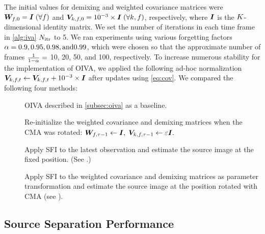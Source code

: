 \documentclass[sip,biber]{now-journal}
\begin{document}
The initial values for demixing and weighted covariance matrices were
$\bm{W} _{f,0} = \bm{I}\; (\forall f)$ and $\bm{V} _{k,f,0} = 10^{-3} \times \bm{I}\; (\forall k, f)$, respectively, where $\bm{I}$ is the $K$-dimensional identity matrix.
We set the number of iterations in each time frame in \cref{alg:iva} $N _{\mathrm{itr}}$ to 5.
We ran experiments using various forgetting factors $\alpha = 0.9, 0.95, 0.98, \text{and} 0.99$,
which were chosen so that the approximate number of frames $\frac{1}{1 - \alpha} =$ 10, 20, 50, and 100, respectively.
To increase numerous stability for the implementation of OIVA,
we applied the following ad-hoc normalization $\cov _{\src,\ft} \gets \cov _{\src,\ft} + 10 ^{-3} \times \Eye$ after updates using \eqref{eq:cov}.
We compared the following four methods:
\begin{description}
  \item[\NaiveIVA] OIVA described in \cref{subsec:oiva} as a baseline.
  \item[\ResetIVA] Re-initialize the weighted covariance and demixing matrices when the CMA was rotated:
      $\bm{W} _{f,\tau - 1} \gets \bm{I}, \; \bm{V} _{k,f,\tau - 1} \gets \varepsilon \bm{I}.$
  \item[\SFIIVAo] Apply SFI to the latest observation and estimate the source image at the fixed position. (See .)
  \item[\SFIIVAm] Apply SFI to the weighted covariance and demixing matrices as parameter transformation and estimate the source image at the position rotated with CMA (see ).
\end{description}

\subsection{Source Separation Performance}
\end{document}

